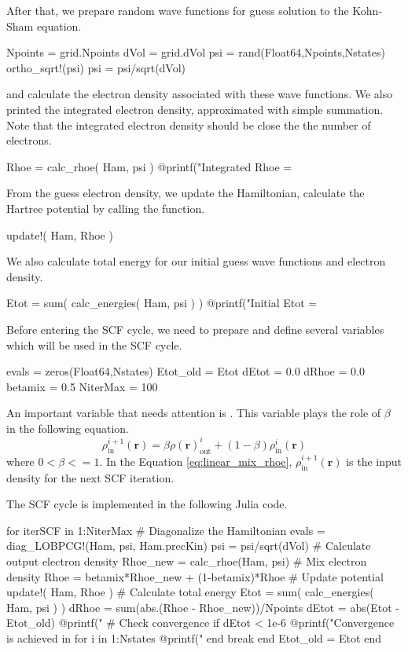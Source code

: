 After that, we prepare random wave functions for guess solution to the Kohn-Sham equation.
\begin{juliacode}
Npoints = grid.Npoints
dVol = grid.dVol
psi = rand(Float64,Npoints,Nstates)
ortho_sqrt!(psi)
psi = psi/sqrt(dVol)
\end{juliacode}
and calculate the electron density associated with these wave functions.
We also printed the integrated electron density, approximated with simple summation.
Note that the integrated electron density should be close the the number of electrons.
\begin{juliacode}
Rhoe = calc_rhoe( Ham, psi )
@printf("Integrated Rhoe = %
\end{juliacode}

From the guess electron density, we update the Hamiltonian, calculate the
Hartree potential by calling the  function.
\begin{juliacode}
update!( Ham, Rhoe )
\end{juliacode}

We also calculate total energy for our initial guess wave functions and electron
density.
\begin{juliacode}
Etot = sum( calc_energies( Ham, psi ) )
@printf("Initial Etot = %
\end{juliacode}

Before entering the SCF cycle, we need to prepare and define several variables
which will be used in the SCF cycle.
\begin{juliacode}
evals = zeros(Float64,Nstates)
Etot_old = Etot
dEtot = 0.0
dRhoe = 0.0
betamix = 0.5
NiterMax = 100
\end{juliacode}
An important variable that needs attention is . This variable
plays the role of $\beta$ in the following equation.
\begin{equation}
\rho^{i+1}_{\mathrm{in}}(\mathbf{r}) = \beta\rho(\mathbf{r})^{i}_{\mathrm{out}} +
(1 - \beta)\rho^{i}_{\mathrm{in}}(\mathbf{r})
\label{eq:linear_mix_rhoe}
\end{equation}
where $0 < \beta <= 1$.
In the Equation \eqref{eq:linear_mix_rhoe}, $\rho^{i+1}_{\mathrm{in}}(\mathbf{r})$
is the input density for the next SCF iteration.

The SCF cycle is implemented in the following Julia code.
\begin{juliacode}
for iterSCF in 1:NiterMax
  # Diagonalize the Hamiltonian
  evals = diag_LOBPCG!(Ham, psi, Ham.precKin)
  psi = psi/sqrt(dVol)
  # Calculate output electron density
  Rhoe_new = calc_rhoe(Ham, psi)
  # Mix electron density
  Rhoe = betamix*Rhoe_new + (1-betamix)*Rhoe
  # Update potential
  update!( Ham, Rhoe )
  # Calculate total energy
  Etot = sum( calc_energies( Ham, psi ) )
  dRhoe = sum(abs.(Rhoe - Rhoe_new))/Npoints
  dEtot = abs(Etot - Etot_old)
  @printf("%
  # Check convergence
  if dEtot < 1e-6
    @printf("Convergence is achieved in %
    for i in 1:Nstates
      @printf("%
    end
    break
  end
  Etot_old = Etot
end
\end{juliacode}

